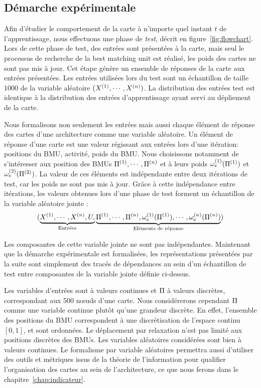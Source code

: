 \documentclass[../main]{subfiles}
\begin{document}
\subsection{Démarche expérimentale}

Afin d'étudier le comportement de la carte à n'importe quel instant $t$ de l'apprentissage, nous effectuons une phase de \emph{test}, décrit en figure~\ref{fig:flowchart}.
Lors de cette phase de test, des entrées sont présentées à la carte, mais seul le processus de recherche de la best matching unit est réalisé, les poids des cartes ne sont pas mis à jour. Cet étape génère un ensemble de réponses de la carte aux entrées présentées.
Les entrées utilisées lors du test sont un échantillon de taille 1000 de la variable aléatoire $(X^{({1})}, \cdots, X^{({n})})$.
La distribution des entrées test est identique à la distribution des entrées d'apprentissage ayant servi au dépliement de la carte.

Nous formalisons non seulement les entrées mais aussi chaque élément de réponse des cartes d'une architecture comme une variable aléatoire.
Un élément de réponse d'une carte est une valeur régissant aux entrées lors d'une itération: positions du BMU, activité, poids du BMU.
Nous choisissons notamment de s'intéresser aux position des BMUs $\Pi^{({1})}, \cdots, \Pi^{({n})}$ et à leurs poids $\omega_{e}^{({1})}(\Pi^{({1})})$ et $\omega_{e}^{({2})}(\Pi^{({2})})$.
La valeur de ces éléments est indépendante entre deux itérations de test, car les poids ne sont pas mis à jour.
Grâce à cette indépendance entre itérations, les valeurs obtenues lors d'une phase de test forment un échantillon de la variable aléatoire jointe : 
$$(\underbrace{X^{({1})}, \cdots, X^{({n})}, U,}_{\text{Entrées}} \underbrace{\Pi^{({1})}, \cdots, \Pi^{({n})}, \omega_e^{({1})}(\Pi^{({1})}), \cdots, \omega_e^{({n})}(\Pi^{({n})})}_{\text{Eléments de réponse}})$$

Les composantes de cette variable jointe ne sont pas indépendantes. Maintenant que la démarche expérimentale est formalisées, les représentations présentées par la suite sont simplement des tracés de dépendances au sein d'un échantillon de test entre composantes de la variable jointe définie ci-dessus.

Les variables d'entrées sont à valeurs continues et $\Pi$ à valeurs discrètes, correspondant aux 500 n\oe{}uds d'une carte. Nous considérerons cependant $\Pi$ comme une variable continue plutôt qu'une grandeur discrète. En effet, l'ensemble des positions du BMU correspondent à une discrétisation de l'espace continu $[0,1]$, et sont ordonnées. Le déplacement par relaxation n'est pas limité aux positions discrètes des BMUs. Les variables aléatoires considérées sont bien à valeurs continues. Le formalisme par variable aléatoires permettra aussi d'utiliser des outils et métriques issus de la théorie de l'information pour qualifier l'organisation des cartes au sein de l'architecture, ce que nous ferons dans le chapitre~\ref{chap:indicateur}.
\end{document}
